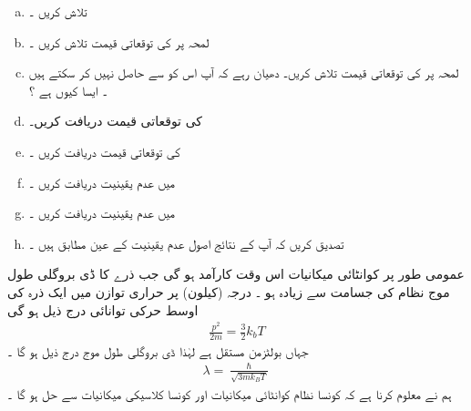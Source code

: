 \begin{enumerate}[a.]
\item
{}    تلاش کریں ۔ 
\item
 لمحہ    پر     کی توقعاتی قیمت تلاش کریں ۔
\item
 لمحہ   پر    کی توقعاتی قیمت تلاش کریں۔  دھیان رہے  کہ  آپ اس کو      سے حاصل نہیں کر سکتے ہیں ۔ ایسا کیوں ہے ؟
\item
{} کی توقعاتی قیمت دریافت کریں۔ 
\item
{}  کی توقعاتی قیمت دریافت کریں ۔  
\item
{}  میں   عدم یقینیت  دریافت کریں ۔ 
\item
{} میں عدم یقینیت دریافت کریں ۔
\item
 تصدیق کریں کہ آپ کے نتائج اصول عدم یقینیت  کے عین مطابق ہیں ۔
\end{enumerate}
عمومی طور پر کوانٹائی میکانیات اس وقت کارآمد   ہو گی  جب   ذرے  کا  ڈی بروگلی طول موج   نظام کی  جسامت  سے زیادہ ہو ۔ درجہ     (کیلون)   پر حراری توازن میں ایک   ذرہ  کی اوسط حرکی توانائی درج ذیل ہو گی 
\begin{align*}
\frac{ p^2 }{ 2 m } =  \frac{ 3 }{ 2 } k_b T
\end{align*}
جہاں    بولٹزمن مستقل ہے   لہٰذا  ڈی بروگلی طول  موج درج ذیل ہو گا ۔
\begin{align*}
\lambda = \frac{ \hslash }{ \sqrt{ 3 m k_B T } }
\end{align*}
ہم نے معلوم کرنا ہے کہ کونسا نظام کوانٹائی میکانیات  اور کونسا  کلاسیکی میکانیات  سے حل ہو گا  ۔ 
